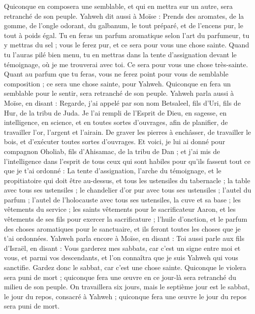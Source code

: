 \begin{multicols}{2}
Quiconque en composera une semblable, et qui en mettra sur un autre, sera retranché de son peuple.
Yahweh dit aussi à Moïse : Prends des aromates, de la gomme, de l’ongle odorant, du galbanum, le tout préparé, et de l'encens pur, le tout à poids égal.
Tu en feras un parfum aromatique selon l'art du parfumeur, tu y mettras du sel ; vous le ferez pur, et ce sera pour vous une chose sainte.
Quand tu l'auras pilé bien menu, tu en mettras dans la tente d'assignation devant le témoignage, où je me trouverai avec toi. Ce sera pour vous une chose très-sainte.
Quant au parfum que tu feras, vous ne ferez point pour vous de semblable composition ; ce sera une chose sainte, pour Yahweh.
Quiconque en fera un semblable pour le sentir, sera retranché de son peuple.
\VerseOne{}Yahweh parla aussi à Moïse, en disant :
Regarde, j'ai appelé par son nom Betsaleel, fils d'Uri, fils de Hur, de la tribu de Juda.
Je l'ai rempli de l'Esprit de Dieu, en sagesse, en intelligence, en science, et en toutes sortes d'ouvrages,
afin de planifier, de travailler l’or, l’argent et l’airain.
De graver les pierres à enchâsser, de travailler le bois, et d’exécuter toutes sortes d’ouvrages.
Et voici, je lui ai donné pour compagnon Oholiab, fils d'Ahisamac, de la tribu de Dan ; et j'ai mis de l’intelligence dans l’esprit de tous ceux qui sont habiles pour qu'ils fassent tout ce que je t’ai ordonné :
La tente d'assignation, l'arche du témoignage, et le propitiatoire qui doit être au-dessus, et tous les ustensiles du tabernacle ;
la table avec tous ses ustensiles ; le chandelier d’or pur avec tous ses ustensiles ; l'autel du parfum ;
l'autel de l'holocauste avec tous ses ustensiles, la cuve et sa base ;
les vêtements du service ; les saints vêtements pour le sacrificateur Aaron, et les vêtements de ses fils pour exercer la sacrificature ;
l'huile d'onction, et le parfum des choses aromatiques pour le sanctuaire, et ils feront toutes les choses que je t'ai ordonnées.
Yahweh parla encore à Moïse, en disant :
Toi aussi parle aux fils d'Israël, en disant : Vous garderez mes sabbats, car c'est un signe entre moi et vous, et parmi vos descendants, et l’on connaîtra que je suis Yahweh qui vous sanctifie.
Gardez donc le sabbat, car c’est une chose sainte. Quiconque le violera sera puni de mort ; quiconque fera une œuvre en ce jour-là sera retranché du milieu de son peuple.
On travaillera six jours, mais le septième jour est le sabbat, le jour du repos, consacré à Yahweh ; quiconque fera une œuvre le jour du repos sera puni de mort.

\end{multicols}
